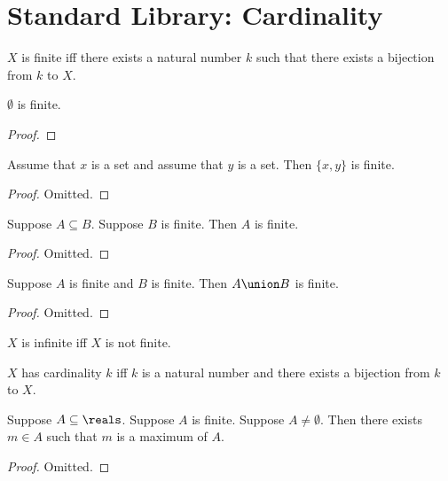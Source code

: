 \section{Standard Library: Cardinality}\label{form_sec_cardinality}

\begin{definition}\label{finite}
    $X$ is finite iff there exists a natural number $k$ such that
        there exists a bijection from $k$ to $X$.
\end{definition}


\begin{lemma} \label{emptyset_is_finite}
    $\emptyset$ is finite.
\end{lemma}
\begin{proof}
\end{proof}

\begin{lemma} \label{pair_is_finite}
    Assume that $x$ is a set and assume that $y$ is a set.
    Then $\{x,y\}$ is finite.
\end{lemma}
\begin{proof}
 Omitted.
\end{proof}

\begin{lemma} \label{subseteq_finite_is_finite}
    Suppose $A\subseteq B$.
    Suppose $B$ is finite.
    Then $A$ is finite.
\end{lemma}
\begin{proof}
    Omitted.
\end{proof}

\begin{lemma} \label{union_of_finite_is_finite}
    Suppose $A$ is finite and $B$ is finite.
    Then $A\union B$ is finite.
\end{lemma}
\begin{proof}
    Omitted.
\end{proof}

\begin{abbreviation}\label{infinite}
    $X$ is infinite iff $X$ is not finite.
\end{abbreviation}

\begin{definition}\label{cardinality}
    $X$ has cardinality $k$ iff $k$ is a natural number and
    there exists a bijection from $k$ to $X$.
\end{definition}

 
\begin{lemma}\label{finite_real_maximum}
    Suppose $A\subseteq\reals$.
    Suppose $A$ is finite.
    Suppose $A\neq \emptyset$.
    Then there exists $m\in A$ such that $m$ is a maximum of $A$.
\end{lemma}
\begin{proof}
    Omitted.
\end{proof}

